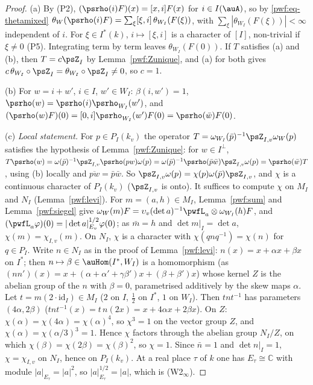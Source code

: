 \documentclass[10pt]{amsart}
\theoremstyle{definition}
\theoremstyle{remark}
\newcommand{\C}{\mathbb C}
\begin{document}
\begin{proof}
(a) By (P2), $(\psrho(i)F)(x)=[x,i]F(x)$ for $i\in I(\auA)$, so by \eqref{pwf:eq-thetamixed}
$\theta_W(\psrho(i)F)=\sum_\xi[\xi,i]\,\theta_{W_I}(F(\xi))$, with $\sum_\xi|\theta_{W_I}(F(\xi))|<\infty$
independent of $i$. For $\xi\in I^*(k)$, $i\mapsto[\xi,i]$ is a character of $[I]$, non-trivial if
$\xi\ne0$ (P5). Integrating term by term leaves $\theta_{W_I}(F(0))$. If $T$ satisfies (a) and (b),
then $T=c\psZ_I$ by Lemma~\ref{pwf:Zunique}, and (a) for both gives $c\,\theta_{W_I}\circ\psZ_I=
\theta_{W_I}\circ\psZ_I\ne0$, so $c=1$.

(b) For $w=i+w'$, $i\in I$, $w'\in W_I$: $\beta(i,w')=1$, $\psrho(w)=\psrho(i)\psrho_{W_I}(w')$, and
$(\psrho(w)F)(0)=[0,i]\psrho_{W_I}(w')F(0)=\psrho(\bar w)F(0)$.

(c) \emph{Local statement.} For $p\in P_I(k_v)$ the operator $T=\omega_{W_I}(\bar p)^{-1}\psZ_{I,v}
\omega_W(p)$ satisfies the hypothesis of Lemma~\ref{pwf:Zunique}: for $w\in I^\perp$, $T\psrho(w)=
\omega(\bar p)^{-1}\psZ_{I,v}\psrho(pw)\omega(p)=\omega(\bar p)^{-1}\psrho(\bar p\bar w)\psZ_{I,v}
\omega(p)=\psrho(\bar w)T$, using (b) locally and $\overline{pw}=\bar p\bar w$. So $\psZ_{I,v}\omega(p)=
\chi(p)\omega(\bar p)\psZ_{I,v}$, and $\chi$ is a continuous character of $P_I(k_v)$ ($\psZ_{I,v}$ is
onto). It suffices to compute $\chi$ on $M_I$ and $N_I$ (Lemma~\ref{pwf:levi}). For $m=(a,h)\in
M_I$, Lemma~\ref{pwf:sum} and Lemma~\ref{pwf:siegel} give $\omega_W(m)F=\upsilon_v(\det a)^{-1}
\pwfL_a\otimes\omega_{W_I}(h)F$, and $(\pwfL_a\varphi)(0)=|\det a|_{E_v}^{1/2}\varphi(0)$; as
$\bar m=h$ and $\det m|_I=\det a$, $\chi(m)=\chi_{I,v}(m)$. On $N_I$, $\chi$ is a character with
$\chi(qnq^{-1})=\chi(n)$ for $q\in P_I$. Write $n\in N_I$ as in the proof of
Lemma~\ref{pwf:levi}: $n(x)=x+\alpha x+\beta x$ on $I^*$; then $n\mapsto\beta\in\auHom(I^*,W_I)$ is a
homomorphism (as $(nn')(x)=x+(\alpha+\alpha'+\gamma\beta')x+(\beta+\beta')x$) whose kernel $Z$ is the
abelian group of the $n$ with $\beta=0$, parametrised additively by the skew maps $\alpha$. Let
$t=m(2\cdot\mathrm{id}_I)\in M_I$ ($2$ on $I$, $\frac12$ on $I^*$, $1$ on $W_I$). Then $tnt^{-1}$
has parameters $(4\alpha,2\beta)$ ($tnt^{-1}(x)=t\,n(2x)=x+4\alpha x+2\beta x$). On $Z$:
$\chi(\alpha)=\chi(4\alpha)=\chi(\alpha)^4$, so $\chi^3=1$ on the vector group $Z$, and $\chi(\alpha)=
\chi(\alpha/3)^3=1$. Hence $\chi$ factors through the abelian group $N_I/Z$, on which
$\chi(\beta)=\chi(2\beta)=\chi(\beta)^2$, so $\chi=1$. Since $\bar n=1$ and $\det n|_I=1$,
$\chi=\chi_{I,v}$ on $N_I$, hence on $P_I(k_v)$. At a real place $\tau$ of $k$ one has $E_\tau\cong\C$
with module $|a|_{E_\tau}=|a|^2$, so $|a|_{E_\tau}^{1/2}=|a|$, which is (W2$_\infty$).


\end{proof}
\end{document}
